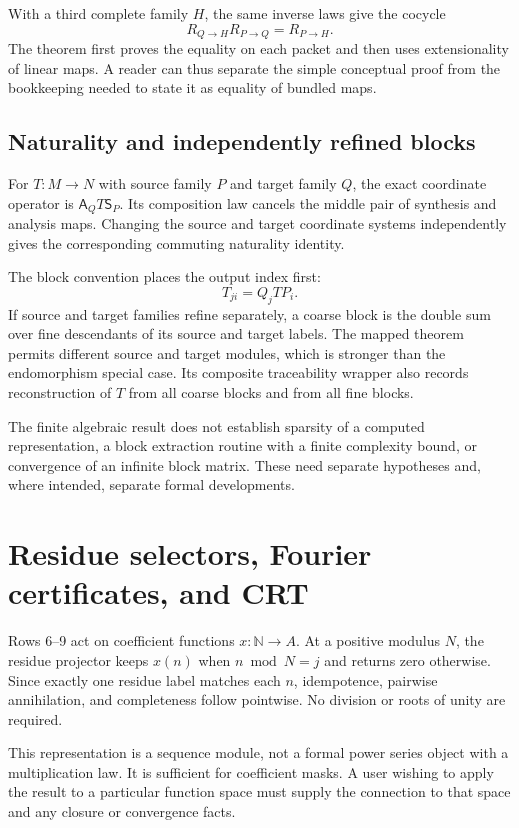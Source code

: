 With a third complete family $H$, the same inverse laws give the cocycle
\[
R_{Q\to H}R_{P\to Q}=R_{P\to H}.
\]
The theorem  first proves the equality on each packet and then uses extensionality of linear maps. A reader can thus separate the simple conceptual proof from the bookkeeping needed to state it as equality of bundled maps.

\subsection{Naturality and independently refined blocks}

For $T:M\to N$ with source family $P$ and target family $Q$, the exact coordinate operator is $\mathsf A_QT\mathsf S_P$. Its composition law cancels the middle pair of synthesis and analysis maps. Changing the source and target coordinate systems independently gives the corresponding commuting naturality identity.

The block convention places the output index first:
\[
T_{ji}=Q_jTP_i.
\]
If source and target families refine separately, a coarse block is the double sum over fine descendants of its source and target labels. The mapped theorem permits different source and target modules, which is stronger than the endomorphism special case. Its composite traceability wrapper also records reconstruction of $T$ from all coarse blocks and from all fine blocks.

The finite algebraic result does not establish sparsity of a computed representation, a block extraction routine with a finite complexity bound, or convergence of an infinite block matrix. These need separate hypotheses and, where intended, separate formal developments.

\section{Residue selectors, Fourier certificates, and CRT}\label{sec:residue}

Rows 6--9 act on coefficient functions $x:\mathbb N\to A$. At a positive modulus $N$, the residue projector keeps $x(n)$ when $n\bmod N=j$ and returns zero otherwise. Since exactly one residue label matches each $n$, idempotence, pairwise annihilation, and completeness follow pointwise. No division or roots of unity are required.

This representation is a sequence module, not a formal power series object with a multiplication law. It is sufficient for coefficient masks. A user wishing to apply the result to a particular function space must supply the connection to that space and any closure or convergence facts.

